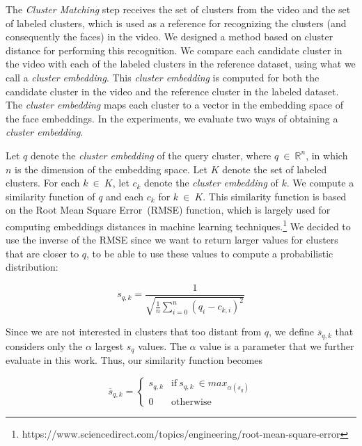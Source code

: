 The \textit{Cluster Matching} step receives the set of clusters from the video and the set of labeled clusters, which is used as a reference for recognizing the clusters (and consequently the faces) in the video.
We designed a method based on cluster distance for performing this recognition.
We compare each candidate cluster in the video with each of the labeled clusters in the reference dataset, using what we call a \emph{cluster embedding}. This \emph{cluster embedding} is computed for both the candidate cluster in the video and the reference cluster in the labeled dataset.
The \emph{cluster embedding} maps each cluster to a vector in the embedding space of the face embeddings.
In the experiments, we evaluate two ways of obtaining a \emph{cluster embedding}.

Let $q$ denote the \emph{cluster embedding} of the query cluster, where $q~\in~\mathbb{R}^{n}$, in which $n$ is the dimension of the embedding space.
%
Let $K$ denote the set of labeled clusters. For each $k~\in~K$, let $c_k$ denote the \emph{cluster embedding} of $k$. 
%
We compute a similarity function of $q$ and each $c_k$ for $k~\in~K$. 
This similarity function is based on the Root Mean Square Error~(RMSE) function, which is largely used for computing embeddings distances in machine learning techniques.\footnote{https://www.sciencedirect.com/topics/engineering/root-mean-square-error}
We decided to use the inverse of the RMSE since we want to return larger values for clusters that are closer to $q$, to be able to use these values to compute a probabilistic distribution:

\begin{equation}
\label{equation:similarity_raw}
    s_{q,k} = \frac{1}{\sqrt{\frac{1}{n}\sum_{i=0}^{n}{(q_i-c_{k,i})^2}}}
\end{equation}

Since we are not interested in clusters that too distant from $q$, we define $\overline{s}_{q,k}$ that considers only the $\alpha$ largest $s_q$ values. The $\alpha$ value is a parameter that we further evaluate in this work. 
Thus, our similarity function becomes

\begin{equation}
\label{equation:similarity}
    \overline{s}_{q,k} = \begin{cases}s_{q,k} & \text{if}~s_{q,k}~\in max_{\alpha(s_q)}\\0 & \text{otherwise}\end{cases}
\end{equation}

